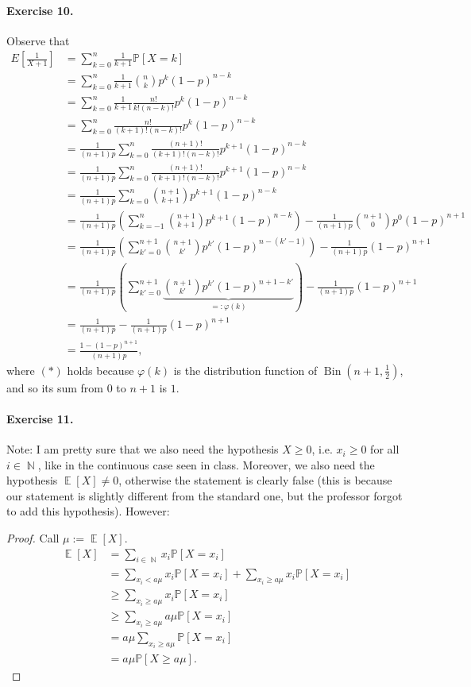 \documentclass[12pt,a4paper]{report}
\theoremstyle{definition}
\theoremstyle{num.custom-title}
\DeclareMathOperator{\E}{\mathbb{E}}
\DeclareMathOperator{\N}{\mathbb{N}}
\renewcommand{\phi}{\varphi}
\renewcommand{\1}{\mathbbm{1}}
\renewcommand{\P}{\mathbb{P}}
\begin{document}
\paragraph{Exercise 10.} Observe that
\begin{align*}
E \left[ \frac{1}{X+1} \right]
&= \sum_{k=0}^n \frac{1}{k+1} \P[X=k] \\
&= \sum_{k=0}^n \frac{1}{k+1} \binom{n}{k} p^k (1-p)^{n-k} \\
&= \sum_{k=0}^n \frac{1}{k+1} \frac{n!}{k!(n-k)!} p^k (1-p)^{n-k} \\
&= \sum_{k=0}^n \frac{n!}{(k+1)!(n-k)!} p^k (1-p)^{n-k} \\
&= \frac{1}{(n+1)p} \sum_{k=0}^n \frac{(n+1)!}{(k+1)!(n-k)!} p^{k+1} (1-p)^{n-k} \\
&= \frac{1}{(n+1)p} \sum_{k=0}^n \frac{(n+1)!}{(k+1)!(n-k)!} p^{k+1} (1-p)^{n-k} \\
&= \frac{1}{(n+1)p} \sum_{k=0}^n \binom{n+1}{k+1} p^{k+1} (1-p)^{n-k} \\
&= \frac{1}{(n+1)p} \left( \sum_{k=-1}^n \binom{n+1}{k+1} p^{k+1} (1-p)^{n-k} \right) - \frac{1}{(n+1)p} \binom{n+1}{0} p^0 (1-p)^{n+1}\\
&= \frac{1}{(n+1)p} \left( \sum_{k'=0}^{n+1} \binom{n+1}{k'} p^{k'} (1-p)^{n-(k'-1)} \right) - \frac{1}{(n+1)p} (1-p)^{n+1}\\
&= \frac{1}{(n+1)p} \left( \sum_{k'=0}^{n+1} \underbrace{\binom{n+1}{k'} p^{k'} (1-p)^{n+1-k'}}_{=:\phi(k)} \right) - \frac{1}{(n+1)p} (1-p)^{n+1}\\
&= \frac{1}{(n+1)p} - \frac{1}{(n+1)p} (1-p)^{n+1} \tag{$*$} \\
&= \frac{1-(1-p)^{n+1}}{(n+1)p},
\end{align*}
where $(*)$ holds because $\phi(k)$ is the distribution function of $\operatorname{Bin}(n+1,\frac{1}{2})$, and so its sum from $0$ to $n+1$ is $1$.

\paragraph{Exercise 11.} Note: I am pretty sure that we also need the hypothesis $X \geq 0$, i.e. $x_i \geq 0$ for all $i \in \N$, like in the continuous case seen in class. Moreover, we also need the hypothesis $\E[X] \neq 0$, otherwise the statement is clearly false (this is because our statement is slightly different from the standard one, but the professor forgot to add this hypothesis). However:
\begin{proof}
Call $\mu := \E[X]$.
\begin{align*}
\E[X] 
&= \sum_{i \in \N} x_i \P[X=x_i] \\
&= \sum_{x_i < a\mu} x_i \P[X=x_i] + \sum_{x_i \geq a\mu} x_i \P[X=x_i] \\
&\geq \sum_{x_i \geq a\mu} x_i \P[X=x_i] \tag{because $X>0$} \\
&\geq \sum_{x_i \geq a\mu} a\mu \P[X=x_i] \\
&= a\mu \sum_{x_i \geq a\mu} \P[X=x_i] \\
&= a\mu \P[X \geq a\mu].
\end{align*}
\end{proof}
\end{document}
